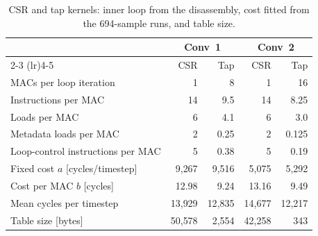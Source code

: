 \begin{table}[htbp]
\centering
\caption{CSR and tap kernels: inner loop from the disassembly, cost fitted from the 694-sample
runs, and table size.}
\label{tab:tap-vs-csr}
\begin{tabular}{lrrrr}
\toprule
 & \multicolumn{2}{c}{Conv~1} & \multicolumn{2}{c}{Conv~2} \\
\cmidrule(lr){2-3} \cmidrule(lr){4-5}
 & CSR & Tap & CSR & Tap \\
\midrule
MACs per loop iteration       & 1     & 8     & 1     & 16    \\
Instructions per MAC          & 14    & 9.5   & 14    & 8.25  \\
Loads per MAC                 & 6     & 4.1   & 6     & 3.0   \\
Metadata loads per MAC        & 2     & 0.25  & 2     & 0.125 \\
Loop-control instructions per MAC & 5 & 0.38  & 5     & 0.19  \\
\midrule
Fixed cost $a$ [cycles/timestep] & 9{,}267 & 9{,}516 & 5{,}075 & 5{,}292 \\
Cost per MAC $b$ [cycles]        & 12.98   & 9.24    & 13.16   & 9.49    \\
Mean cycles per timestep         & 13{,}929 & 12{,}835 & 14{,}677 & 12{,}217 \\
\midrule
Table size [bytes]            & 50{,}578 & 2{,}554 & 42{,}258 & 343 \\
\bottomrule
\end{tabular}
\end{table}
